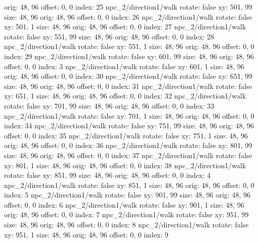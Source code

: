   orig: 48, 96
  offset: 0, 0
  index: 25
npc_2/direction1/walk
  rotate: false
  xy: 501, 99
  size: 48, 96
  orig: 48, 96
  offset: 0, 0
  index: 26
npc_2/direction1/walk
  rotate: false
  xy: 501, 1
  size: 48, 96
  orig: 48, 96
  offset: 0, 0
  index: 27
npc_2/direction1/walk
  rotate: false
  xy: 551, 99
  size: 48, 96
  orig: 48, 96
  offset: 0, 0
  index: 28
npc_2/direction1/walk
  rotate: false
  xy: 551, 1
  size: 48, 96
  orig: 48, 96
  offset: 0, 0
  index: 29
npc_2/direction1/walk
  rotate: false
  xy: 601, 99
  size: 48, 96
  orig: 48, 96
  offset: 0, 0
  index: 3
npc_2/direction1/walk
  rotate: false
  xy: 601, 1
  size: 48, 96
  orig: 48, 96
  offset: 0, 0
  index: 30
npc_2/direction1/walk
  rotate: false
  xy: 651, 99
  size: 48, 96
  orig: 48, 96
  offset: 0, 0
  index: 31
npc_2/direction1/walk
  rotate: false
  xy: 651, 1
  size: 48, 96
  orig: 48, 96
  offset: 0, 0
  index: 32
npc_2/direction1/walk
  rotate: false
  xy: 701, 99
  size: 48, 96
  orig: 48, 96
  offset: 0, 0
  index: 33
npc_2/direction1/walk
  rotate: false
  xy: 701, 1
  size: 48, 96
  orig: 48, 96
  offset: 0, 0
  index: 34
npc_2/direction1/walk
  rotate: false
  xy: 751, 99
  size: 48, 96
  orig: 48, 96
  offset: 0, 0
  index: 35
npc_2/direction1/walk
  rotate: false
  xy: 751, 1
  size: 48, 96
  orig: 48, 96
  offset: 0, 0
  index: 36
npc_2/direction1/walk
  rotate: false
  xy: 801, 99
  size: 48, 96
  orig: 48, 96
  offset: 0, 0
  index: 37
npc_2/direction1/walk
  rotate: false
  xy: 801, 1
  size: 48, 96
  orig: 48, 96
  offset: 0, 0
  index: 38
npc_2/direction1/walk
  rotate: false
  xy: 851, 99
  size: 48, 96
  orig: 48, 96
  offset: 0, 0
  index: 4
npc_2/direction1/walk
  rotate: false
  xy: 851, 1
  size: 48, 96
  orig: 48, 96
  offset: 0, 0
  index: 5
npc_2/direction1/walk
  rotate: false
  xy: 901, 99
  size: 48, 96
  orig: 48, 96
  offset: 0, 0
  index: 6
npc_2/direction1/walk
  rotate: false
  xy: 901, 1
  size: 48, 96
  orig: 48, 96
  offset: 0, 0
  index: 7
npc_2/direction1/walk
  rotate: false
  xy: 951, 99
  size: 48, 96
  orig: 48, 96
  offset: 0, 0
  index: 8
npc_2/direction1/walk
  rotate: false
  xy: 951, 1
  size: 48, 96
  orig: 48, 96
  offset: 0, 0
  index: 9

